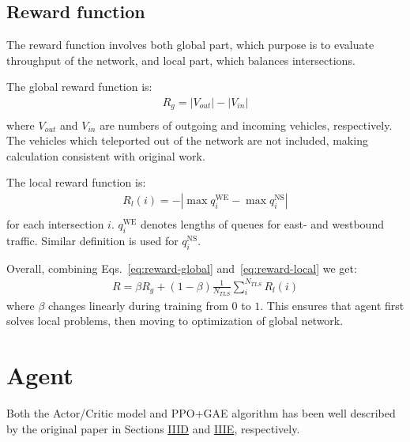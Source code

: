 \documentclass{article}
\begin{document}
    \subsection{Reward function}
    The reward function involves both global part, which purpose is to evaluate throughput of the network,
    and local part, which balances intersections.

    The global reward function is:
    \begin{align}
        R_g = |V_{out}| - |V_{in}| \\
        \label{eq:reward-global}
    \end{align}
    where $V_{out}$ and $V_{in}$ are numbers of outgoing and incoming vehicles, respectively.
    The vehicles which teleported out of the network are not included, making calculation consistent with original work.

    The local reward function is:
    \begin{align}
        R_l(i) = -|\max q_i^\text{WE} - \max q_i^\text{NS}| \\
        \label{eq:reward-local}
    \end{align}
    for each intersection $i$. $q_i^\text{WE}$ denotes lengths of queues for east- and westbound traffic.
    Similar definition is used for $q_i^\text{NS}$.

    Overall, combining Eqs.~\ref{eq:reward-global} and~\ref{eq:reward-local} we get:
    \begin{align}
        R = \beta R_g + (1 - \beta) \frac{1}{N_{TLS}} \sum\limits_{i}^{N_{TLS}}R_l(i)
    \end{align}
    where $\beta$ changes linearly during training from $0$ to $1$.
    This ensures that agent first solves local problems, then moving to optimization of global network.

    \section{Agent}
    Both the Actor/Critic model and PPO+GAE algorithm has been well described by the original paper in Sections
    \href{https://arxiv.org/pdf/1808.01876.pdf#subsection.3.4}{IIID} and \href{https://arxiv.org/pdf/1808.01876.pdf#subsection.3.5}{IIIE},
    respectively.
\end{document}
